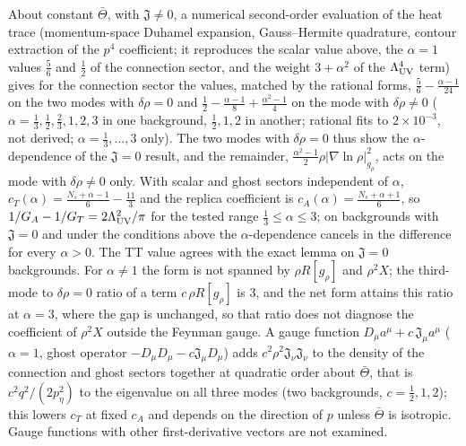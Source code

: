 About constant \(\bar\Theta\), with \(\mathfrak J\neq0\), a numerical second-order evaluation of the heat trace (momentum-space Duhamel expansion, Gauss--Hermite quadrature, contour extraction of the \(p^4\) coefficient; it reproduces the scalar value above, the \(\alpha=1\) values \(\tfrac56\) and \(\tfrac12\) of the connection sector, and the weight \(3+\alpha^2\) of the \(\Lambda_{\mathrm{UV}}^4\) term) gives for the connection sector the values, matched by the rational forms, \(\tfrac56-\tfrac{\alpha-1}{24}\) on the two modes with \(\delta\rho=0\) and \(\tfrac12-\tfrac{\alpha-1}8+\tfrac{\alpha^2-1}4\) on the mode with \(\delta\rho\neq0\) (\(\alpha=\tfrac13,\tfrac12,\tfrac23,1,2,3\) in one background, \(\tfrac12,1,2\) in another; rational fits to \(2\times10^{-3}\), not derived; \(\alpha=\tfrac13,\dots,3\) only). The two modes with \(\delta\rho=0\) thus show the \(\alpha\)-dependence of the \(\mathfrak J=0\) result, and the remainder, \(\tfrac{\alpha^2-1}2\rho|\nabla\ln\rho|^2_{g_\rho}\), acts on the mode with \(\delta\rho\neq0\) only. With scalar and ghost sectors independent of \(\alpha\), \(c_T(\alpha)=\tfrac{N_s+\alpha-1}6-\tfrac{11}3\) and the replica coefficient is \(c_A(\alpha)=\tfrac{N_s+\alpha+1}6\), so \(1/G_A-1/G_T=2\Lambda_{\mathrm{UV}}^2/\pi\) for the tested range \(\tfrac13\le\alpha\le3\); on backgrounds with \(\mathfrak J=0\) and under the conditions above the \(\alpha\)-dependence cancels in the difference for every \(\alpha>0\). The TT value agrees with the exact lemma on \(\mathfrak J=0\) backgrounds. For \(\alpha\neq1\) the form is not spanned by \(\rho R[g_\rho]\) and \(\rho^2X\); the third-mode to \(\delta\rho=0\) ratio of a term \(c\,\rho R[g_\rho]\) is \(3\), and the net form attains this ratio at \(\alpha=3\), where the gap is unchanged, so that ratio does not diagnose the coefficient of \(\rho^2X\) outside the Feynman gauge. A gauge function \(D_\mu a^\mu+c\,\mathfrak J_\mu a^\mu\) (\(\alpha=1\), ghost operator \(-D_\mu D_\mu-c\mathfrak J_\mu D_\mu\)) adds \(c^2\rho^2\mathfrak J_\nu\mathfrak J_\nu\) to the density of the connection and ghost sectors together at quadratic order about \(\bar\Theta\), that is \(c^2q^2/(2p_\eta^2)\) to the eigenvalue on all three modes (two backgrounds, \(c=\tfrac12,1,2\)); this lowers \(c_T\) at fixed \(c_A\) and depends on the direction of \(p\) unless \(\bar\Theta\) is isotropic. Gauge functions with other first-derivative vectors are not examined.

